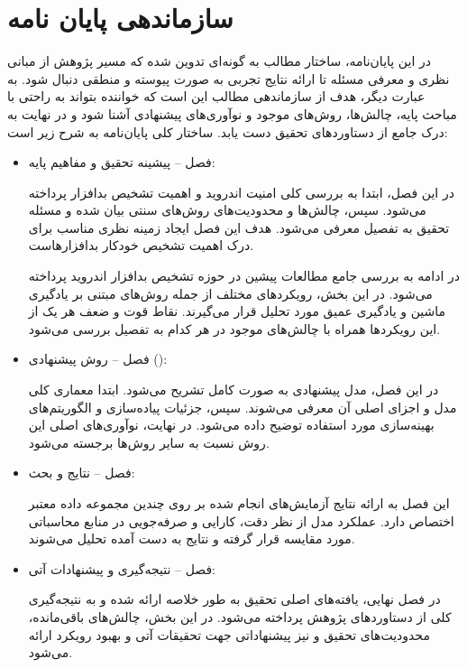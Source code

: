 \section{سازماندهی پایان نامه}\label{organiz}
در این پایان‌نامه، ساختار مطالب به گونه‌ای تدوین شده که مسیر پژوهش از مبانی نظری و معرفی مسئله تا ارائه نتایج تجربی به صورت پیوسته و منطقی دنبال شود. به عبارت دیگر، هدف از سازماندهی مطالب این است که خواننده بتواند به راحتی با مباحث پایه، چالش‌ها، روش‌های موجود و نوآوری‌های پیشنهادی آشنا شود و در نهایت به درک جامع از دستاوردهای تحقیق دست یابد. ساختار کلی پایان‌نامه به شرح زیر است:
\begin{itemize}
    \item فصل  – پیشینه تحقیق و مفاهیم پایه:
    
    در این فصل، ابتدا به بررسی کلی امنیت اندروید و اهمیت تشخیص بدافزار پرداخته می‌شود. سپس، چالش‌ها و محدودیت‌های روش‌های سنتی بیان شده و مسئله تحقیق به تفصیل معرفی می‌شود. هدف این فصل ایجاد زمینه نظری مناسب برای درک اهمیت تشخیص خودکار بدافزارهاست.
    
    در ادامه به بررسی جامع مطالعات پیشین در حوزه تشخیص بدافزار اندروید پرداخته می‌شود. در این بخش، رویکردهای مختلف از جمله روش‌های مبتنی بر یادگیری ماشین و یادگیری عمیق مورد تحلیل قرار می‌گیرند. نقاط قوت و ضعف هر یک از این رویکردها همراه با چالش‌های موجود در هر کدام به تفصیل بررسی می‌شود.
    
    \item فصل  – روش پیشنهادی ():
    
    در این فصل، مدل پیشنهادی  به صورت کامل تشریح می‌شود. ابتدا معماری کلی مدل و اجزای اصلی آن معرفی می‌شوند. سپس، جزئیات پیاده‌سازی و الگوریتم‌های بهینه‌سازی مورد استفاده توضیح داده می‌شود. در نهایت، نوآوری‌های اصلی این روش نسبت به سایر روش‌ها برجسته می‌شود.
    
    \item فصل  – نتایج و بحث:
    
    این فصل به ارائه نتایج آزمایش‌های انجام شده بر روی چندین مجموعه داده معتبر اختصاص دارد. عملکرد مدل  از نظر دقت، کارایی و صرفه‌جویی در منابع محاسباتی مورد مقایسه قرار گرفته و نتایج به دست آمده تحلیل می‌شوند.
    
    \item فصل  – نتیجه‌گیری و پیشنهادات آتی:
    
    در فصل نهایی، یافته‌های اصلی تحقیق به طور خلاصه ارائه شده و به نتیجه‌گیری کلی از دستاوردهای پژوهش پرداخته می‌شود. در این بخش، چالش‌های باقی‌مانده، محدودیت‌های تحقیق و نیز پیشنهاداتی جهت تحقیقات آتی و بهبود رویکرد ارائه می‌شود.
\end{itemize}


